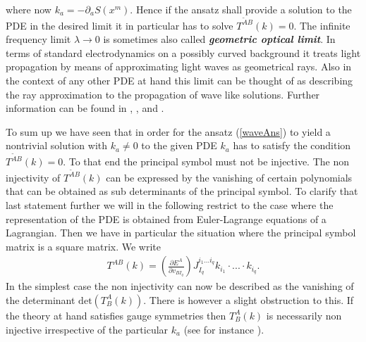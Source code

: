 \documentclass[a4paper,12pt, DIV=14, BCOR=5mm, twoside, headsepline]{scrbook}
\begin{document}
where now $k_a = - \partial_aS(x^m)$. Hence if the ansatz shall provide a solution to the PDE in the desired limit it in particular has to solve $T^{\tilde{A} B}(k) = 0$. The infinite frequency limit $\lambda \rightarrow 0 $ is sometimes also called \textit{\textbf{geometric optical limit}}. In terms of standard electrodynamics on a possibly curved background it treats light propagation by means of approximating light waves as geometrical rays. Also in the context of any other PDE at hand this limit can be thought of as describing the ray approximation to the propagation of wave like solutions. Further information can be found in \cite{seiler1994analysis}, \cite{2012arXiv1211.1914K}, \cite{2011PhRvD..83d4047R} and \cite{2018PhRvD..97h4036D}.

To sum up we have seen that in order for the ansatz (\ref{waveAns}) to yield a nontrivial solution with $k_a \neq 0$ to the given PDE $k_a$ has to satisfy the condition $T^{\tilde{A} B}(k) = 0$. To that end the principal symbol must not be injective. The non injectivity of $T^{\tilde{A} B}(k)$ can be expressed by the vanishing of certain polynomials that can be obtained  as sub determinants of the principal symbol. To clarify that last statement further we will in the following restrict to the case where the representation of the PDE is obtained from Euler-Lagrange equations of a Lagrangian. Then we have in particular the situation where the principal symbol matrix is a square matrix. We write 
\begin{align}
T^{A B}(k) =  \left ( \frac{\partial E^{A}}{\partial v_{BI_q}} \right ) J_{I_q}^{i_1...i_q} k_{i_1} \cdot ... \cdot k_{i_q}.
\end{align}
In the simplest case the non injectivity can now be described as the vanishing of the determinant $\mathrm{det}(T^A_B(k))$. There is however a slight obstruction to this. If the theory at hand satisfies gauge symmetries then $T^A_B(k)$ is necessarily non injective irrespective of the particular $k_a$ (see for instance \cite{2018PhRvD..97h4036D}).
\end{document}

